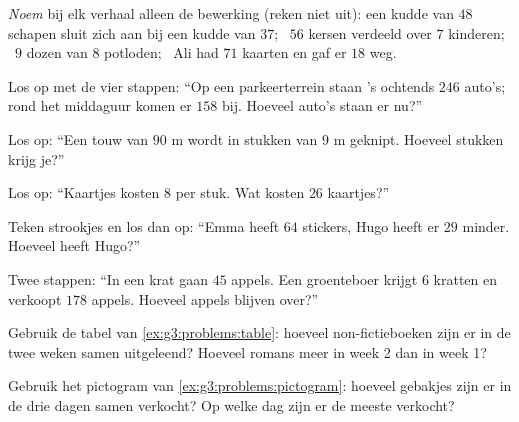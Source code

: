 \begin{exercise}[$\star$]\label{exo:g3:problems:1}
\emph{Noem} bij elk verhaal alleen de bewerking (reken niet uit): een
kudde van $48$ schapen sluit zich aan bij een kudde van $37$; \ $56$
kersen verdeeld over $7$ kinderen; \ $9$ dozen van $8$ potloden; \ Ali had
$71$ kaarten en gaf er $18$ weg.
\end{exercise}

\begin{exercise}[$\star$]\label{exo:g3:problems:2}
Los op met de vier stappen: ``Op een parkeerterrein staan 's ochtends
$246$ auto's; rond het middaguur komen er $158$ bij. Hoeveel auto's staan
er nu?''
\end{exercise}

\begin{exercise}[$\star$]\label{exo:g3:problems:3}
Los op: ``Een touw van $90$ m wordt in stukken van $9$ m geknipt. Hoeveel
stukken krijg je?''
\end{exercise}

\begin{exercise}[$\star$]\label{exo:g3:problems:4}
Los op: ``Kaartjes kosten $8$ per stuk. Wat kosten $26$ kaartjes?''
\end{exercise}

\begin{exercise}[$\star$]\label{exo:g3:problems:5}
Teken strookjes en los dan op: ``Emma heeft $64$ stickers, Hugo heeft er
$29$ minder. Hoeveel heeft Hugo?''
\end{exercise}

\begin{exercise}[$\star$]\label{exo:g3:problems:6}
Twee stappen: ``In een krat gaan $45$ appels. Een groenteboer krijgt $6$
kratten en verkoopt $178$ appels. Hoeveel appels blijven over?''
\end{exercise}

\begin{exercise}[$\star$]\label{exo:g3:problems:7}
Gebruik de tabel van \cref{ex:g3:problems:table}: hoeveel non-fictieboeken
zijn er in de twee weken samen uitgeleend? Hoeveel romans meer in week 2
dan in week 1?
\end{exercise}

\begin{exercise}[$\star$]\label{exo:g3:problems:8}
Gebruik het pictogram van \cref{ex:g3:problems:pictogram}: hoeveel
gebakjes zijn er in de drie dagen samen verkocht? Op welke dag zijn er de
meeste verkocht?
\end{exercise}

